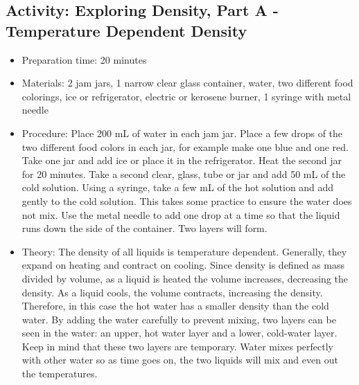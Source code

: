 \begin{itemize}
{\begin{itemize}
\subsection{Activity: Exploring Density, Part A - Temperature Dependent Density}
\begin{itemize}
\item{Preparation time: 20 minutes}
\item{Materials: 2 jam jars, 1 narrow clear glass container, water, two different food colorings, ice or refrigerator, electric or kerosene burner, 1 syringe with metal needle}
\item{Procedure: Place 200 mL of water in each jam jar. Place a few drops of the two different food colors in each jar, for example make one blue and one red. Take one jar and add ice or place it in the refrigerator. Heat the second jar for 20 minutes. Take a second clear, glass, tube or jar and add 50 mL of the cold solution. Using a syringe, take a few mL of the hot solution and add gently to the cold solution. This takes some practice to ensure the water does not mix. Use the metal needle to add one drop at a time so that the liquid runs down the side of the container. Two layers will form. }
\item{Theory: The density of all liquids is temperature dependent. Generally, they expand on heating and contract on cooling. Since density is defined as mass divided by volume, as a liquid is heated the volume increases, decreasing the density. As a liquid cools, the volume contracts, increasing the density. Therefore, in this case the hot water has a smaller density than the cold water. By adding the water carefully to prevent mixing, two layers can be seen in the water: an upper, hot water layer and a lower, cold-water layer. Keep in mind that these two layers are temporary. Water mixes perfectly with other water so as time goes on, the two liquids will mix and even out the temperatures.}
\end{itemize}


\end{itemize}}
\end{itemize}
